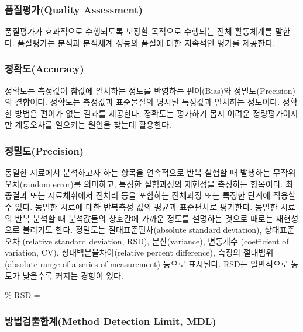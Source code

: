\documentclass[
]{book}
\begin{document}
\hypertarget{uxd488uxc9c8uxd3c9uxac00quality-assessment}{%
\subsubsection{품질평가(Quality Assessment)}\label{uxd488uxc9c8uxd3c9uxac00quality-assessment}}

품질평가가 효과적으로 수행되도록 보장할 목적으로 수행되는 전체 활동체계를 말한다. 품질평가는 분석과 분석체계 성능의 품질에 대한 지속적인 평가를 제공한다.

\hypertarget{uxc815uxd655uxb3c4accuracy}{%
\subsubsection{정확도(Accuracy)}\label{uxc815uxd655uxb3c4accuracy}}

정확도는 측정값이 참값에 일치하는 정도를 반영하는 편이(Bias)와 정밀도(Precision)의 결합이다. 정확도는 측정값과 표준물질의 명시된 특성값과 일치하는 정도이다. 정확한 방법은 편이가 없는 결과를 제공한다. 정확도는 평가하기 몹시 어려운 정량평가이지만 계통오차를 일으키는 원인을 찾는데 활용한다.

\hypertarget{uxc815uxbc00uxb3c4precision}{%
\subsubsection{정밀도(Precision)}\label{uxc815uxbc00uxb3c4precision}}

동일한 시료에서 분석하고자 하는 항목을 연속적으로 반복 실험할 때 발생하는 무작위오차(random error)를 의미하고, 특정한 실험과정의 재현성을 측정하는 항목이다. 최종결과 또는 시료채취에서 전처리 등을 포함하는 전체과정 또는 특정한 단계에 적용할 수 있다. 동일한 시료에 대한 반복측정 값의 평균과 표준편차로 평가한다. 동일한 시료의 반복 분석할 때 분석값들의 상호간에 가까운 정도를 설명하는 것으로 때로는 재현성으로 불리기도 한다. 정밀도는 절대표준편차(absolute standard deviation), 상대표준오차 (relative standard deviation, RSD), 분산(variance), 변동계수 (coefficient of variation, CV), 상대백분율차이(relative percent difference), 측정의 절대범위(absolute range of a series of measurement) 등으로 표시된다. RSD는 일반적으로 농도가 낮을수록 커지는 경향이 있다.

\% RSD =

\hypertarget{uxbc29uxbc95uxac80uxcd9cuxd55cuxacc4method-detection-limit-mdl}{%
\subsubsection{방법검출한계(Method Detection Limit, MDL)}\label{uxbc29uxbc95uxac80uxcd9cuxd55cuxacc4method-detection-limit-mdl}}
\end{document}
